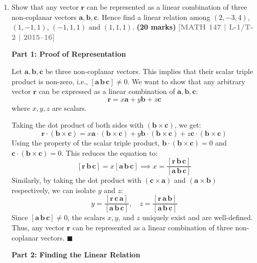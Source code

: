 \documentclass[12pt,a4paper]{article}
\newcommand{\yr}[1]{\hfill\textcolor{gray}{\small\textbf{[#1]}}}
\newcommand{\mk}[1]{\textcolor{orange!70!black}{\small\textbf{(#1 marks)}}}
\begin{document}
\begin{enumerate}
\begin{tcolorbox}[enhanced,breakable,ansbox,colback=cD!4,colframe=cD,boxrule=0.8pt,arc=5pt,title={\textbf{Answer}},fonttitle=\bfseries\color{white},colbacktitle=cD]
\end{tcolorbox}

\item Show that any vector $\mathbf{r}$ can be represented as a linear combination of three non-coplanar vectors $\mathbf{a},\mathbf{b},\mathbf{c}$. Hence find a linear relation among $(2,-3,4)$, $(1,-1,1)$, $(-1,1,1)$ and $(1,1,1)$.
\mk{20} \yr{MATH 147 | L-1/T-2 | 2015--16}

\begin{tcolorbox}[enhanced,breakable,ansbox,colback=cD!4,colframe=cD,boxrule=0.8pt,arc=5pt,title={\textbf{Answer}},fonttitle=\bfseries\color{white},colbacktitle=cD]

\textbf{Part 1: Proof of Representation}

Let $\mathbf{a}, \mathbf{b}, \mathbf{c}$ be three non-coplanar vectors. This implies that their scalar triple product is non-zero, i.e., $[\mathbf{a}\,\mathbf{b}\,\mathbf{c}] \neq 0$.
We want to show that any arbitrary vector $\mathbf{r}$ can be expressed as a linear combination of $\mathbf{a}, \mathbf{b}, \mathbf{c}$:
\[ \mathbf{r} = x\mathbf{a} + y\mathbf{b} + z\mathbf{c} \]
where $x, y, z$ are scalars. 

Taking the dot product of both sides with $(\mathbf{b} \times \mathbf{c})$, we get:
\[ \mathbf{r} \cdot (\mathbf{b} \times \mathbf{c}) = x\mathbf{a} \cdot (\mathbf{b} \times \mathbf{c}) + y\mathbf{b} \cdot (\mathbf{b} \times \mathbf{c}) + z\mathbf{c} \cdot (\mathbf{b} \times \mathbf{c}) \]
Using the property of the scalar triple product, $\mathbf{b} \cdot (\mathbf{b} \times \mathbf{c}) = 0$ and $\mathbf{c} \cdot (\mathbf{b} \times \mathbf{c}) = 0$. This reduces the equation to:
\[ [\mathbf{r}\,\mathbf{b}\,\mathbf{c}] = x[\mathbf{a}\,\mathbf{b}\,\mathbf{c}] \implies x = \frac{[\mathbf{r}\,\mathbf{b}\,\mathbf{c}]}{[\mathbf{a}\,\mathbf{b}\,\mathbf{c}]} \]
Similarly, by taking the dot product with $(\mathbf{c} \times \mathbf{a})$ and $(\mathbf{a} \times \mathbf{b})$ respectively, we can isolate $y$ and $z$:
\[ y = \frac{[\mathbf{r}\,\mathbf{c}\,\mathbf{a}]}{[\mathbf{a}\,\mathbf{b}\,\mathbf{c}]}, \quad z = \frac{[\mathbf{r}\,\mathbf{a}\,\mathbf{b}]}{[\mathbf{a}\,\mathbf{b}\,\mathbf{c}]} \]
Since $[\mathbf{a}\,\mathbf{b}\,\mathbf{c}] \neq 0$, the scalars $x, y$, and $z$ uniquely exist and are well-defined. Thus, any vector $\mathbf{r}$ can be represented as a linear combination of three non-coplanar vectors. \hfill $\blacksquare$

\vspace{1.5em}
\textbf{Part 2: Finding the Linear Relation}


\end{tcolorbox}
\end{enumerate}
\end{document}
